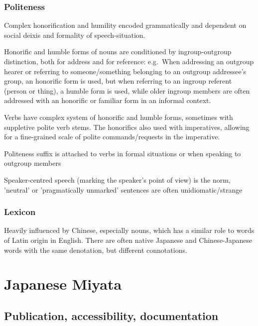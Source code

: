 \documentclass[a4paper, 11pt]{book}
\begin{document}
\subsubsection*{Politeness}
\begin{itemize*}
\item Complex honorification and humility encoded grammatically and dependent on social deixis and formality of speech-situation.
\item Honorific and humble forms of nouns are conditioned by ingroup-outgroup distinction, both for address and for reference: e.g.\ When addressing an outgroup hearer or referring to someone/something belonging to an outgroup addressee's group, an honorific form is used, but when referring to an ingroup referent (person or thing), a humble form is used, while older ingroup members are often addressed with an honorific or familiar form in an informal context.
\item Verbs have complex system of honorific and humble forms, sometimes with suppletive polite verb stems. The honorifics also used with imperatives, allowing for a fine-grained scale of polite commands/requests in the imperative.
\item Politeness suffix is attached to verbs in formal situations or when speaking to outgroup members
\item Speaker-centred speech (marking the speaker's point of view) is the norm, 'neutral' or 'pragmatically unmarked' sentences are often unidiomatic/strange
\end{itemize*}

\subsubsection*{Lexicon}
\begin{itemize*}
\item Heavily influenced by Chinese, especially nouns, which has a similar role to words of Latin origin in English. There are often native Japanese and Chinese-Japanese words with the same denotation, but different connotations.
\end{itemize*}


\section{Japanese Miyata}
\label{sec:Japanese Miyata}

\subsection{Publication, accessibility, documentation}
\end{document}
